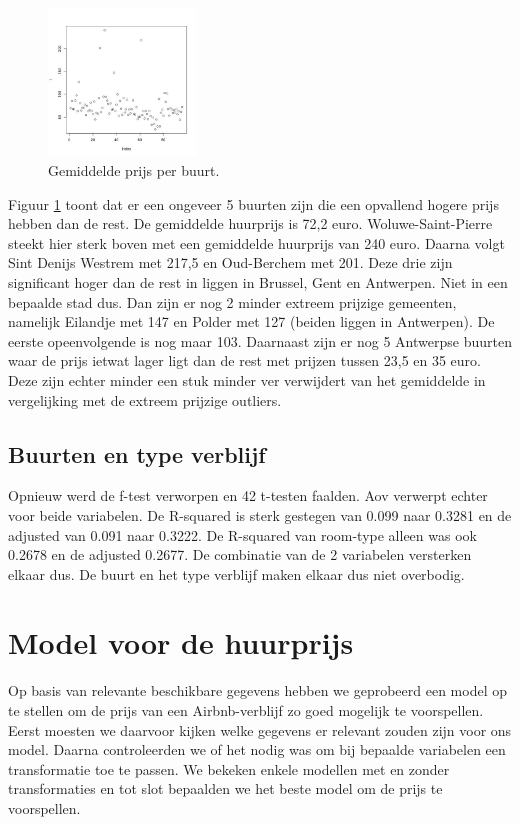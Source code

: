 \documentclass[a4paper,kulak]{kulakarticle} %
\begin{document}
\begin{figure}
	\begin{center}
		\includegraphics[width=0.35\textwidth]{pn.jpg}
	\end{center}
	\caption{Gemiddelde prijs per buurt.}
	\label{fig:pn}
\end{figure}
Figuur \ref{fig:pn} toont dat er een ongeveer 5 buurten zijn die een opvallend hogere prijs hebben dan de rest.
De gemiddelde huurprijs is 72,2 euro.
Woluwe-Saint-Pierre steekt hier sterk boven met een gemiddelde huurprijs van 240 euro.
Daarna volgt Sint Denijs Westrem met 217,5 en Oud-Berchem met 201.
Deze drie zijn significant hoger dan de rest in liggen in Brussel, Gent en Antwerpen. Niet in een bepaalde stad dus.
Dan zijn er nog 2 minder extreem prijzige gemeenten, namelijk Eilandje met 147 en Polder met 127 (beiden liggen in Antwerpen). De eerste opeenvolgende is nog maar 103.
Daarnaast zijn er nog 5 Antwerpse buurten waar de prijs ietwat lager ligt dan de rest met prijzen tussen 23,5 en 35 euro.
Deze zijn echter minder een stuk minder ver verwijdert van het gemiddelde in vergelijking met de extreem prijzige outliers.

\subsection{Buurten en type verblijf}
Opnieuw werd de f-test verworpen en 42 t-testen faalden.
Aov verwerpt echter voor beide variabelen.
De R-squared is sterk gestegen van 0.099 naar 0.3281 en de adjusted van 0.091 naar 0.3222.
De R-squared van room-type alleen was ook 0.2678 en de adjusted 0.2677. De combinatie van de 2 variabelen versterken elkaar dus.
De buurt en het type verblijf maken elkaar dus niet overbodig.




\section{Model voor de huurprijs} \label{sec:mh}
Op basis van relevante beschikbare gegevens hebben we geprobeerd een model op te stellen om de prijs van een Airbnb-verblijf zo goed mogelijk te voorspellen. Eerst moesten we daarvoor kijken welke gegevens er relevant zouden zijn voor ons model. Daarna controleerden we of het nodig was om bij bepaalde variabelen een transformatie toe te passen. We bekeken enkele modellen met en zonder transformaties en tot slot bepaalden we het beste model om de prijs te voorspellen.
\end{document}
